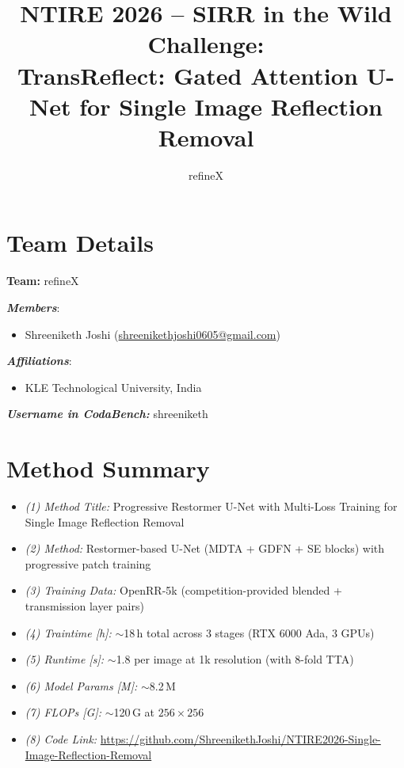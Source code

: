 \documentclass[10pt,twocolumn,letterpaper]{article}
\title{NTIRE 2026 -- SIRR in the Wild Challenge:\\
\large TransReflect: Gated Attention U-Net for Single Image Reflection Removal}
\author{refineX}
\begin{document}
\maketitle

\section{Team Details}

\textbf{Team:} refineX
\par\vspace{6pt}

\textit{\textbf{Members}}:
\begin{itemize}[leftmargin=*, noitemsep, label={}]
    \item Shreeniketh Joshi (\href{mailto:shreenikethjoshi0605@gmail.com}{shreenikethjoshi0605@gmail.com})
\end{itemize}
\par\vspace{6pt}

\textit{\textbf{Affiliations}}:
\begin{itemize}[leftmargin=*, noitemsep, label={}]
    \item KLE Technological University, India
\end{itemize}

\textit{\textbf{Username in CodaBench:}} shreeniketh

\section{Method Summary}

\begin{itemize}[leftmargin=*, noitemsep, label={}]
    \item \textit{(1) Method Title:} Progressive Restormer U-Net with Multi-Loss Training for Single Image Reflection Removal
    \item \textit{(2) Method:} Restormer-based U-Net (MDTA + GDFN + SE blocks) with progressive patch training
    \item \textit{(3) Training Data:} OpenRR-5k (competition-provided blended + transmission layer pairs)
    \item \textit{(4) Traintime [h]:} $\sim$18\,h total across 3 stages (RTX 6000 Ada, 3 GPUs)
    \item \textit{(5) Runtime [s]:} $\sim$1.8 per image at 1k resolution (with 8-fold TTA)
    \item \textit{(6) Model Params [M]:} $\sim$8.2\,M
    \item \textit{(7) FLOPs [G]:} $\sim$120\,G at $256\times 256$
    \item \textit{(8) Code Link:} \url{https://github.com/ShreenikethJoshi/NTIRE2026-Single-Image-Reflection-Removal}
\end{itemize}
\end{document}
